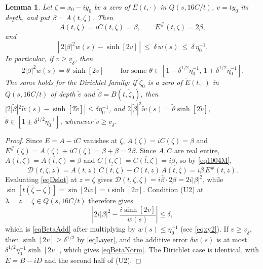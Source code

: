 \documentclass[11pt,twoside,reqno]{amsart}
\def\ti{\tilde}
\def\d{\delta}
\def\l{\lambda}
\def\b{\beta}
\def\uv{\underline{v}_{\d}}
\theoremstyle{plain}
\newtheorem{lemma}{Lemma}
\numberwithin{equation}{section}
\begin{document}
\begin{lemma}\label{lemBeta}
Let $\zeta=x_0-iy_0$ be a zero of $E(t,\cdot)$ in $Q(s,16C/t)$, $v=ty_0$ its depth, and put $\b=A(t,\zeta)$. Then
$$A(t,\zeta)=iC(t,\zeta)=\b,\qquad E^\#(t,\zeta)=2\b,$$
and
\begin{equation}
\left|\,2|\b|^2 w(s)-\sinh[2v]\,\right|\ \leq\ \d\,w(s)\ \leq\ \d\,\eta_0^{-1}.
\label{eqBetaAdd}
\end{equation}
In particular, if $v\geq\uv$, then
\begin{equation}
2|\b|^2 w(s)=\theta\,\sinh[2v]\qquad\text{ for some }\theta\in\left[1-\d^{1/2}\eta_0^{-1},\,1+\d^{1/2}\eta_0^{-1}\right].
\label{eqBetaNorm}
\end{equation}
The same holds for the Dirichlet family: if $\ti\zeta_0$ is a zero of $\ti E(t,\cdot)$ in $Q(s,16C/t)$ of depth $\ti v$ and $\ti\b=B(t,\ti\zeta_0)$, then $|2|\ti\b|^2\ti w(s)-\sinh[2\ti v]|\leq\d\eta_0^{-1}$, and $2|\ti\b|^2\ti w(s)=\ti\theta\sinh[2\ti v]$, $\ti\theta\in[1\pm\d^{1/2}\eta_0^{-1}]$, whenever $\ti v\geq\uv$.
\end{lemma}

\begin{proof}
Since $E=A-iC$ vanishes at $\zeta$, $A(\zeta)=iC(\zeta)=\b$ and $E^\#(\zeta)=A(\zeta)+iC(\zeta)=\b+\b=2\b$. Since $A,C$ are real entire, $\bar A(t,\zeta)=\overline{A(t,\zeta)}=\bar\b$ and $\bar C(t,\zeta)=\overline{C(t,\zeta)}=i\bar\b$, so by \eqref{eq1004M},
\begin{equation}
{\mathcal D}(t,\zeta,z)=A(t,z)\,\overline{C(t,\zeta)}-C(t,z)\,\overline{A(t,\zeta)}
=i\bar\b\,E^\#(t,z).
\label{eqDslot}
\end{equation}
Evaluating \eqref{eqDslot} at $z=\zeta$ gives ${\mathcal D}(t,\zeta,\zeta)=i\bar\b\cdot2\b=2i|\b|^2$, while $\sin[t(\bar\zeta-\zeta)]=\sin[2iv]=i\sinh[2v]$. Condition (U2) at $\l=z=\zeta\in Q(s,16C/t)$ therefore gives
$$\left|2i|\b|^2-\frac{i\sinh[2v]}{w(s)}\right|\leq\d,$$
which is \eqref{eqBetaAdd} after multiplying by $w(s)\leq\eta_0^{-1}$ (see \eqref{eqxy2}). If $v\geq\uv$, then $\sinh[2v]\geq\d^{1/2}$ by \eqref{eqLayer}, and the additive error $\d w(s)$ is at most $\d^{1/2}\eta_0^{-1}\sinh[2v]$, which gives \eqref{eqBetaNorm}. The Dirichlet case is identical, with $\ti E=B-iD$ and the second half of (U2).
\end{proof}
\end{document}
